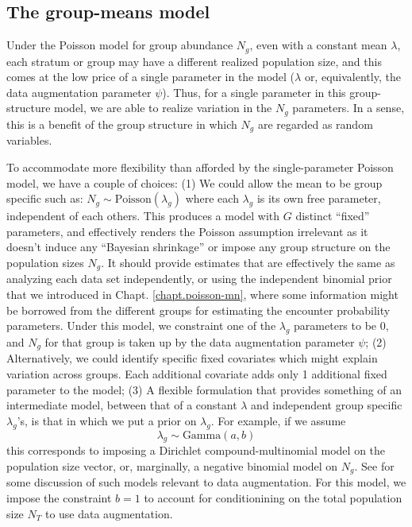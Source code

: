 \subsection{The group-means model}

Under the Poisson model for group abundance $N_g$, even with a
constant mean $\lambda$, each stratum or group may have a different
realized population size, and this comes at the low price of a single
parameter in the model ($\lambda$ or, equivalently, the data
augmentation parameter $\psi$).  Thus, for a single parameter in this
group-structure model, we are able to realize variation in the $N_{g}$
parameters. In a sense, this is a benefit of the group structure in
which $N_{g}$ are regarded as random variables.

To accommodate more flexibility than afforded by the single-parameter
Poisson model, we have a couple of choices: (1) We could allow the
mean to be group specific such as: $N_g \sim
\mbox{Poisson}(\lambda_{g})$ where each $\lambda_{g}$ is its own free
parameter, independent of each others. This produces a model with $G$
distinct ``fixed'' parameters, and effectively renders the Poisson
assumption irrelevant as it doesn't induce any ``Bayesian shrinkage''
\citep{sauer_link:2002} or impose any group structure on the
population sizes $N_{g}$. It should provide estimates that are
effectively the same as analyzing each data set independently, or
using the independent binomial prior that we introduced in
Chapt. \ref{chapt.poisson-mn}, where some information might be
borrowed from the different groups for estimating the encounter
probability parameters.  Under this model, we constraint one of the
$\lambda_{g}$ parameters to be 0, and $N_{g}$ for that group is taken
up by the data augmentation parameter $\psi$; (2) Alternatively, we
could identify specific fixed covariates which might explain variation
across groups. Each additional covariate adds only 1 additional fixed
parameter to the model; (3) A flexible formulation that provides
something of an intermediate model, between that of a constant
$\lambda$ and independent group specific $\lambda_{g}$'s, is that in
which we put a prior on $\lambda_{g}$. For example, if we assume
\[
 \lambda_{g} \sim \mbox{Gamma}(a,b)
\]
this corresponds to imposing a Dirichlet compound-multinomial
model on the population size vector, or, marginally, a negative
binomial model on $N_{g}$. See \citet{takemura:1999} for some
discussion of such models relevant to data augmentation.  For this
model, we impose the constraint $b=1$ to account for conditionining on
the total population size $N_{T}$ to use data augmentation.


